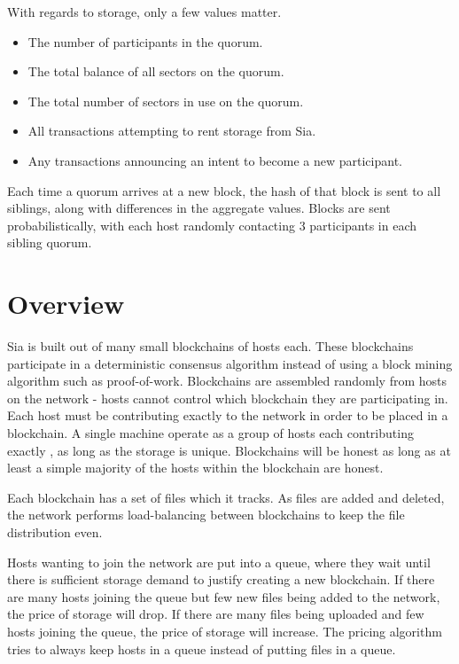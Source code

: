 \documentclass[twocolumn]{article}
\begin{document}
With regards to storage, only a few values matter.
\begin{itemize}
	\item The number of participants in the quorum.
	\item The total balance of all sectors on the quorum.
	\item The total number of sectors in use on the quorum.
	\item All transactions attempting to rent storage from Sia.
	\item Any transactions announcing an intent to become a new participant.
\end{itemize}

Each time a quorum arrives at a new block, the hash of that block is sent to all siblings, along with differences in the aggregate values.
Blocks are sent probabilistically, with each host randomly contacting 3 participants in each sibling quorum.

\section{Overview}

Sia is built out of many small blockchains of \numhosts{} hosts each.
These blockchains participate in a deterministic consensus algorithm instead of using a block mining algorithm such as proof-of-work.
Blockchains are assembled randomly from hosts on the network - hosts cannot control which blockchain they are participating in.
Each host must be contributing exactly \storageperhost{} to the network in order to be placed in a blockchain.
A single machine operate as a group of hosts each contributing exactly \storageperhost{}, as long as the storage is unique.
Blockchains will be honest as long as at least a simple majority of the hosts within the blockchain are honest.

Each blockchain has a set of files which it tracks.
As files are added and deleted, the network performs load-balancing between blockchains to keep the file distribution even.

Hosts wanting to join the network are put into a queue, where they wait until there is sufficient storage demand to justify creating a new blockchain.
If there are many hosts joining the queue but few new files being added to the network, the price of storage will drop.
If there are many files being uploaded and few hosts joining the queue, the price of storage will increase.
The pricing algorithm tries to always keep hosts in a queue instead of putting files in a queue.
\end{document}
